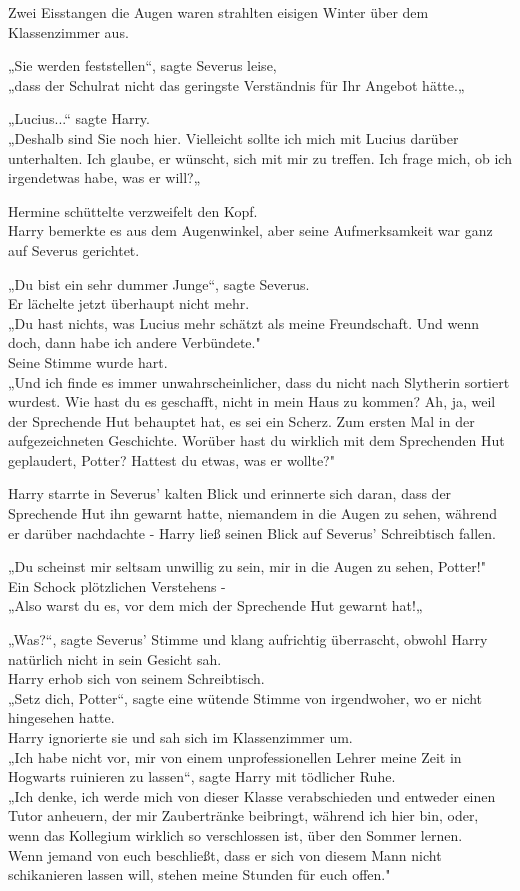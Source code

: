 {Zwei Eisstangen die Augen waren strahlten eisigen Winter über dem Klassenzimmer aus.

„Sie werden feststellen“, sagte Severus leise,\\ „dass der Schulrat nicht das geringste Verständnis für Ihr Angebot hätte.„

„Lucius...“ sagte Harry.\\ „Deshalb sind Sie noch hier. Vielleicht sollte ich mich mit Lucius darüber unterhalten. Ich glaube, er wünscht, sich mit mir zu treffen. Ich frage mich, ob ich irgendetwas habe, was er will?„

Hermine schüttelte verzweifelt den Kopf.\\ Harry bemerkte es aus dem Augenwinkel, aber seine Aufmerksamkeit war ganz auf Severus gerichtet.

„Du bist ein sehr dummer Junge“, sagte Severus.\\ Er lächelte jetzt überhaupt nicht mehr.\\ „Du hast nichts, was Lucius mehr schätzt als meine Freundschaft. Und wenn doch, dann habe ich andere Verbündete."\\ Seine Stimme wurde hart.\\ „Und ich finde es immer unwahrscheinlicher, dass du nicht nach Slytherin sortiert wurdest. Wie hast du es geschafft, nicht in mein Haus zu kommen? Ah, ja, weil der Sprechende Hut behauptet hat, es sei ein Scherz. Zum ersten Mal in der aufgezeichneten Geschichte. Worüber hast du wirklich mit dem Sprechenden Hut geplaudert, Potter? Hattest du etwas, was er wollte?"

Harry starrte in Severus' kalten Blick und erinnerte sich daran, dass der Sprechende Hut ihn gewarnt hatte, niemandem in die Augen zu sehen, während er darüber nachdachte - Harry ließ seinen Blick auf Severus' Schreibtisch fallen.

„Du scheinst mir seltsam unwillig zu sein, mir in die Augen zu sehen, Potter!"\\ Ein Schock plötzlichen Verstehens -\\ „Also warst du es, vor dem mich der Sprechende Hut gewarnt hat!„

„Was?“, sagte Severus' Stimme und klang aufrichtig überrascht, obwohl Harry natürlich nicht in sein Gesicht sah.\\ Harry erhob sich von seinem Schreibtisch.\\ „Setz dich, Potter“, sagte eine wütende Stimme von irgendwoher, wo er nicht hingesehen hatte.\\ Harry ignorierte sie und sah sich im Klassenzimmer um.\\ „Ich habe nicht vor, mir von einem unprofessionellen Lehrer meine Zeit in Hogwarts ruinieren zu lassen“, sagte Harry mit tödlicher Ruhe.\\ „Ich denke, ich werde mich von dieser Klasse verabschieden und entweder einen Tutor anheuern, der mir Zaubertränke beibringt, während ich hier bin, oder, wenn das Kollegium wirklich so verschlossen ist, über den Sommer lernen.\\ Wenn jemand von euch beschließt, dass er sich von diesem Mann nicht schikanieren lassen will, stehen meine Stunden für euch offen."

}
